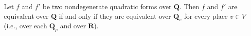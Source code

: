 Let $f$ and $f'$ be two nondegenerate quadratic forms over $\mathbf{Q}$. Then $f$ and $f'$ are equivalent over $\mathbf{Q}$ if and only if they are equivalent over $\mathbf{Q}_v$ for every place $v \in V$ (i.e., over each $\mathbf{Q}_p$ and over $\mathbf{R}$).

